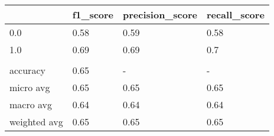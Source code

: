 \begin{tabular}{llll}
\toprule
{} & f1\_score & precision\_score & recall\_score \\
\midrule
0.0          &     0.58 &            0.59 &         0.58 \\
1.0          &     0.69 &            0.69 &          0.7 \\
             &          &                 &              \\
accuracy     &     0.65 &               - &            - \\
micro avg    &     0.65 &            0.65 &         0.65 \\
macro avg    &     0.64 &            0.64 &         0.64 \\
weighted avg &     0.65 &            0.65 &         0.65 \\
\bottomrule
\end{tabular}
